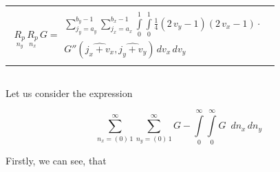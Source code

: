 \documentclass[twoside, 10pt]{article}
\def\myvspacebeforesubsection{-2.0mm}
\def\myvspaceaftersubsection{-2.5mm}
\begin{document}
\begin{multicols}{2}
\begin{center}
\begin{tabular}{ l }


$\begin{array}{lr}
\underset{n_y}{R_{p}}\,\underset{n_x}{R_{p}}\,G =
\begin{array}{c}
 \sum\limits_{j_{y}=a_{y}}^{b_{y} - 1} \sum\limits_{j_{x}=a_{x}}^{b_{x} - 1} \int\limits_{0}^{1} \int\limits_{0}^{1}\frac{1}{4} \left(2 \, v_{y} - 1\right)  \left(2 \, v_{x} - 1\right) \cdot \\
G''\left(\widehat{j_{x} + v_{x}}, \widehat{j_{y} + v_{y}}\right)\,{d v_{x}}\,{d v_{y}}
\end{array}
\end{array}$ \\



\end{tabular}
\end{center}


\vspace{\myvspacebeforesubsection}
    \subsection*{}\label{a-way-of-calculating-deltaleftevright}
\vspace{\myvspaceaftersubsection}


    Let us consider the expression

\begin{equation} \label{eq:12}
\sum\limits_{n_x=\left(0\right)\,1}^{\infty}
\sum\limits_{n_y=\left(0\right)\,1}^{\infty}
G%
-
\int\limits_{0}^{\infty}
\int\limits_{0}^{\infty}
G%
\,\,\,d{n_x}\,d{n_y}
\end{equation}

    Firstly, we can see, that


\end{multicols}
\end{document}

